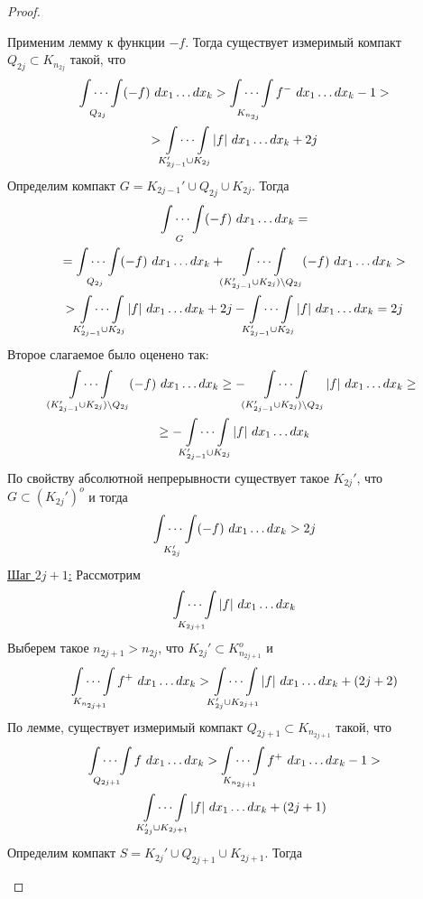 \begin{proof}
\begin{itemize}
        Применим лемму к функции $-f$. Тогда существует измеримый компакт $Q_{2j}\subset K_{n_{2j}}$ такой, что
        \begin{multline*}
            \idotsint\limits_{Q_{2j}}(-f)\ dx_1 \dots dx_k > \idotsint\limits_{K_{n_{2j}}}f^-\ dx_1 \dots dx_k -1 >\\
            >\idotsint\limits_{K_{2j-1}'\cup K_{2j}}|f|\ dx_1 \dots dx_k+2j
        \end{multline*}
        Определим компакт $G=K_{2j-1}'\cup Q_{2j}\cup K_{2j}$. Тогда
        \begin{multline*}
            \idotsint\limits_{G}(-f)\ dx_1 \dots dx_k = \\
            =\idotsint\limits_{Q_{2j}}(-f)\ dx_1 \dots dx_k + \idotsint\limits_{(K_{2j-1}'\cup K_{2j})\setminus Q_{2j}}(-f)\ dx_1 \dots dx_k > \\
            >\idotsint\limits_{K_{2j-1}'\cup K_{2j}}|f|\ dx_1 \dots dx_k+2j-\idotsint\limits_{K_{2j-1}'\cup K_{2j}}|f|\ dx_1 \dots dx_k = 2j
        \end{multline*}
        Второе слагаемое было оценено так:
        \begin{multline*}
            \idotsint\limits_{(K_{2j-1}'\cup K_{2j})\setminus Q_{2j}}(-f)\ dx_1 \dots dx_k \geq -\idotsint\limits_{(K_{2j-1}'\cup K_{2j})\setminus Q_{2j}}|f|\ dx_1 \dots dx_k \geq \\
            \geq-\idotsint\limits_{K_{2j-1}'\cup K_{2j}}|f|\ dx_1 \dots dx_k
        \end{multline*}
        По свойству абсолютной непрерывности существует такое $K_{2j}'$, что \\
        $G\subset (K_{2j}')^o$ и тогда
        \[\idotsint\limits_{K_{2j}'}(-f)\ dx_1 \dots dx_k > 2j\]
        \underline{Шаг $2j+1$:}
        Рассмотрим
        \[\idotsint\limits_{K_{2j+1}}|f|\ dx_1 \dots dx_k\]
        Выберем такое $n_{2j+1}>n_{2j}$, что $K_{2j}'\subset K^o_{n_{2j+1}}$ и
        \[\idotsint\limits_{K_{n_{2j+1}}}f^+\ dx_1 \dots dx_k > \idotsint\limits_{K_{2j}'\cup K_{2j+1}}|f|\ dx_1\dots dx_k+(2j+2)\]
        По лемме, существует измеримый компакт $Q_{2j+1}\subset K_{n_{2j+1}}$ такой, что
        \begin{multline*}
            \idotsint\limits_{Q_{2j+1}}f\ dx_1 \dots dx_k > \idotsint\limits_{K_{n_{2j+1}}}f^+\ dx_1 \dots dx_k -1 > \\ 
        \idotsint\limits_{K_{2j}'\cup K_{2j+1}}|f|\ dx_1 \dots dx_k+(2j+1)
        \end{multline*}
        Определим компакт $S=K_{2j}'\cup Q_{2j+1}\cup K_{2j+1}$. Тогда

\end{itemize}
\end{proof}
